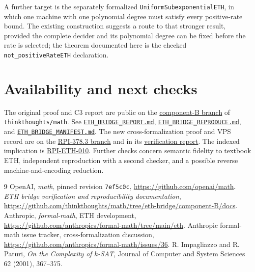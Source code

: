\documentclass[11pt,letterpaper]{article}
\newcommand{\lean}[1]{\texttt{#1}}
\begin{document}
A further target is the separately formalized \lean{UniformSubexponentialETH}, in which one machine with one polynomial degree must satisfy every positive-rate bound. The existing construction suggests a route to that stronger result, provided the complete decider and its polynomial degree can be fixed before the rate is selected; the theorem documented here is the checked \lean{not\_positiveRateETH} declaration.

\section{Availability and next checks}
The original proof and C3 report are public on the
\href{https://github.com/thinkthoughts/math/tree/eth-bridge/component-B}{component-B branch} of \lean{thinkthoughts/math}.
See \href{https://github.com/thinkthoughts/math/blob/eth-bridge/component-B/docs/ETH_BRIDGE_REPORT.md}{\lean{ETH\_BRIDGE\_REPORT.md}}, \href{https://github.com/thinkthoughts/math/blob/eth-bridge/component-B/docs/ETH_BRIDGE_REPRODUCE.md}{\lean{ETH\_BRIDGE\_REPRODUCE.\allowbreak{}md}}, and \href{https://github.com/thinkthoughts/math/blob/eth-bridge/component-B/docs/ETH_BRIDGE_MANIFEST.md}{\lean{ETH\_BRIDGE\_MANIFEST.md}}.
The new cross-formalization proof and VPS record are on the
\href{https://github.com/thinkthoughts/math/tree/eth-bridge/rpi-378.3a}{RPI-378.3 branch} and in its \href{https://github.com/thinkthoughts/math/blob/55fdced45/docs/RPI-378.3d_REPORT.md}{verification report}. The indexed implication is \href{https://github.com/thinkthoughts/rpi-index}{RPI-ETH-010}. Further checks concern semantic fidelity to textbook ETH, independent reproduction with a second checker, and a possible reverse machine-and-encoding reduction.

\begin{thebibliography}{9}\small
{} OpenAI, \emph{math}, pinned revision \lean{7ef5c0c}, \url{https://github.com/openai/math}.
 \emph{ETH bridge verification and reproducibility documentation}, \url{https://github.com/thinkthoughts/math/tree/eth-bridge/component-B/docs}.
 Anthropic, \emph{formal-math}, ETH development, \url{https://github.com/anthropics/formal-math/tree/main/eth}.
 Anthropic formal-math issue tracker, cross-formalization discussion, \url{https://github.com/anthropics/formal-math/issues/36}.
 R. Impagliazzo and R. Paturi, \emph{On the Complexity of $k$-SAT}, Journal of Computer and System Sciences 62 (2001), 367--375.
\end{thebibliography}
\end{document}
